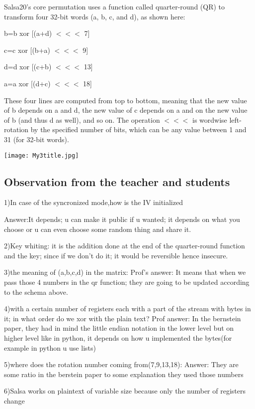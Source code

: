 \documentclass{article}
\begin{document}
Salsa20’s core permutation uses a function called quarter-round (QR) to
transform four 32-bit words (a, b, c, and d), as shown here:


   b=b xor [(a+d) \(<<<\) 7]
   
   
   c=c xor [(b+a) \(<<<\) 9]
   
   
   d=d xor [(c+b) \(<<<\) 13]
   
   
   a=a xor [(d+c) \(<<<\) 18]

These four lines are computed from top to bottom, meaning that the
new value of b depends on a and d, the new value of c depends on a and on
the new value of b (and thus d as well), and so on.
The operation \(<<<\) is wordwise left-rotation by the specified number of
bits, which can be any value between 1 and 31 (for 32-bit words).



\texttt{[image: My3title.jpg]}

\subsection{Observation from the teacher and students}


1)In case of the syncronized mode,how is the IV initialized


Answer:It depends; u can make it public if u wanted; it depends on what you choose or u can even choose some random thing and share it.


2)Key whiting: it is the addition done at the end of the quarter-round
function and the key; since if we don't do it; it would be reversible 
hence insecure.


3)the meaning of (a,b,c,d) in the matrix:
Prof's answer: It means that when we pass those 4 numbers in the qr function; they are going to be updated according to the schema above. 


4)with a certain number of registers each with a part of the stream with bytes in it; in what order do we xor with the plain text?
Prof answer: In the bernstein paper, they had in mind the little endian notation in the lower level but on higher level like in python, it depends on how u implemented the bytes(for example in python u use lists)

5)where does the rotation number coming from(7,9,13,18):
Answer: They are some ratio in the berstein paper to some explanation they used those numbers

6)Salsa works on plaintext of variable size because only the number of registers change
\end{document}
